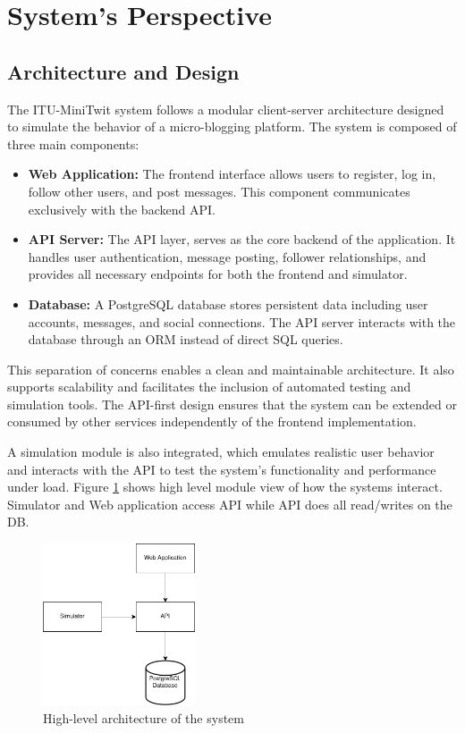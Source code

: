 \section{System's Perspective}

\subsection{Architecture and Design}
The ITU-MiniTwit system follows a modular client-server architecture designed to simulate the behavior of a micro-blogging platform. The system is composed of three main components:

\begin{itemize}
  \item \textbf{Web Application:} The frontend interface allows users to register, log in, follow other users, and post messages. This component communicates exclusively with the backend API.
  
  \item \textbf{API Server:} The API layer, serves as the core backend of the application. It handles user authentication, message posting, follower relationships, and provides all necessary endpoints for both the frontend and simulator.
  
  \item \textbf{Database:} A PostgreSQL database stores persistent data including user accounts, messages, and social connections. The API server interacts with the database through an ORM instead of direct SQL queries.
\end{itemize}

This separation of concerns enables a clean and maintainable architecture. It also supports scalability and facilitates the inclusion of automated testing and simulation tools. The API-first design ensures that the system can be extended or consumed by other services independently of the frontend implementation.

A simulation module is also integrated, which emulates realistic user behavior and interacts with the API to test the system's functionality and performance under load. Figure \ref{fig:simple-architecture} shows high level module view of how the systems interact. Simulator and Web application access API while API does all read/writes on the DB. 

\begin{figure}[H]
  \centering
  \includegraphics[width=0.4\textwidth]{report/images/simple-arch.png}
  \caption{High-level architecture of the system}
  \label{fig:simple-architecture}
\end{figure}

